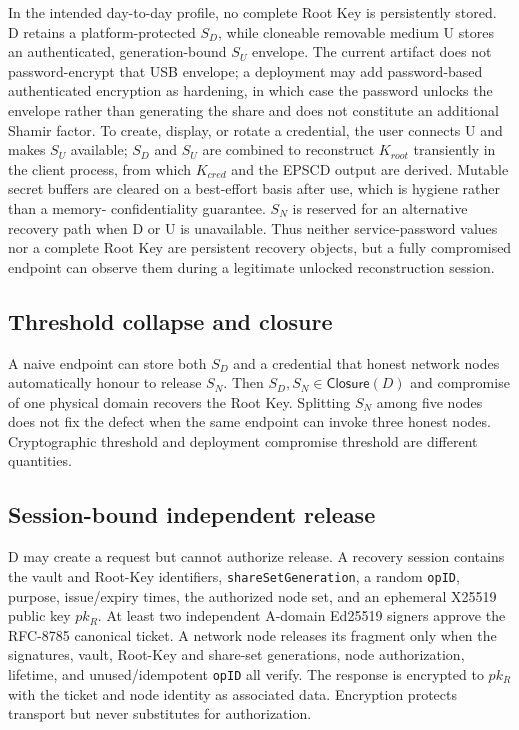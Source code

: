 \documentclass[preprint,12pt]{elsarticle}
\begin{document}
In the intended day-to-day profile, no complete Root Key is persistently
stored. D retains a platform-protected $S_D$, while cloneable removable medium
U stores an authenticated, generation-bound $S_U$ envelope. The current
artifact does not password-encrypt that USB envelope; a deployment may add
password-based authenticated encryption as hardening, in which case the
password unlocks the envelope rather than generating the share and does not
constitute an additional Shamir factor. To create, display, or rotate a
credential, the user connects U and makes $S_U$ available; $S_D$ and $S_U$ are
combined to reconstruct $K_{root}$ transiently in the client process, from
which $K_{cred}$ and the EPSCD output are derived. Mutable secret buffers are
cleared on a best-effort basis after use, which is hygiene rather than a memory-
confidentiality guarantee. $S_N$ is reserved for an alternative recovery path
when D or U is unavailable. Thus neither service-password values nor a complete
Root Key are persistent recovery objects, but a fully compromised endpoint can
observe them during a legitimate unlocked reconstruction session.

\subsection{Threshold collapse and closure}

A naive endpoint can store both $S_D$ and a credential that honest network
nodes automatically honour to release $S_N$. Then
$S_D,S_N\in\mathsf{Closure}(D)$ and compromise of one physical domain recovers
the Root Key. Splitting $S_N$ among five nodes does not fix the defect when the
same endpoint can invoke three honest nodes. Cryptographic threshold and
deployment compromise threshold are different quantities.



\subsection{Session-bound independent release}

D may create a request but cannot authorize release. A recovery session
contains the vault and Root-Key identifiers, \texttt{shareSetGeneration}, a
random \texttt{opID}, purpose, issue/expiry times, the authorized node set, and
an ephemeral X25519 public key $pk_R$. At least two independent A-domain
Ed25519 signers approve the RFC-8785 canonical ticket. A network node releases
its fragment only when the signatures, vault, Root-Key and share-set
generations, node authorization, lifetime, and unused/idempotent \texttt{opID}
all verify. The response is encrypted to $pk_R$ with the ticket and node
identity as associated data. Encryption protects transport but never
substitutes for authorization.
\end{document}
